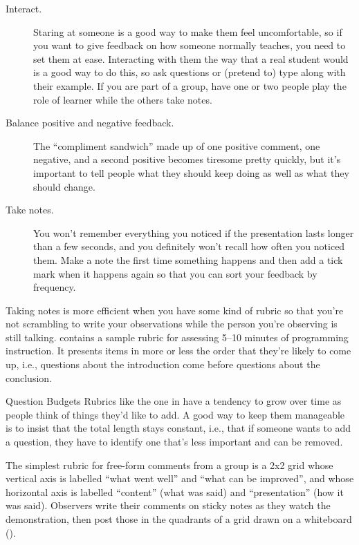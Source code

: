 \begin{description}

\item[Interact.]
  Staring at someone is a good way to make them feel uncomfortable,
  so if you want to give feedback on how someone normally teaches,
  you need to set them at ease.
  Interacting with them the way that a real student would is a good way to do this,
  so ask questions or (pretend to) type along with their example.
  If you are part of a group,
  have one or two people play the role of learner
  while the others take notes.

\item[Balance positive and negative feedback.]
  The ``compliment sandwich'' made up of one positive comment,
  one negative,
  and a second positive
  becomes tiresome pretty quickly,
  but it's important to tell people what they should keep doing
  as well as what they should change.

\item[Take notes.]
  You won't remember everything you noticed
  if the presentation lasts longer than a few seconds,
  and you definitely won't recall how often you noticed them.
  Make a note the first time something happens
  and then add a tick mark when it happens again
  so that you can sort your feedback by frequency.

\end{description}

Taking notes is more efficient when you have some kind of rubric
so that you're not scrambling to write your observations
while the person you're observing is still talking.
 contains a sample rubric
for assessing 5--10 minutes of programming instruction.
It presents items in more or less the order that they're likely to come up,
i.e.,
questions about the introduction come before questions about the conclusion.

\begin{aside}{Question Budgets}
  Rubrics like the one in 
  have a tendency to grow over time as people think of things they'd like to add.
  A good way to keep them manageable is to insist that
  the total length stays constant,
  i.e.,
  that if someone wants to add a question,
  they have to identify one that's less important and can be removed.
\end{aside}

The simplest rubric for free-form comments from a group
is a 2x2 grid whose vertical axis is labelled ``what went well'' and ``what can be improved'',
and whose horizontal axis is labelled ``content'' (what was said)
and ``presentation'' (how it was said).
Observers write their comments on sticky notes as they watch the demonstration,
then post those in the quadrants of a grid drawn on a whiteboard
().

